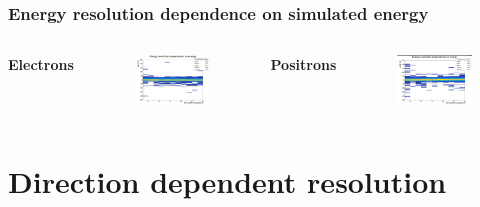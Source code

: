 \documentclass{beamer}
\begin{document}
		\begin{frame}
			\frametitle{Energy resolution dependence on simulated energy}
			\begin{columns}
				\centering
				\Large \textbf{Electrons}
				\begin{figure}
					\centering
					\includegraphics[width = 0.95 \linewidth]{images/c_e_deltaenergy_energy.png}
				\end{figure}
				\centering
				\Large \textbf{Positrons}
				\begin{figure}
					\centering
					\includegraphics[width = 0.95 \linewidth]{images/c_p_deltaenergy_energy.png}
				\end{figure}
			\end{columns}
		\end{frame}
		
	\section{Direction dependent resolution}
	
\end{document}
